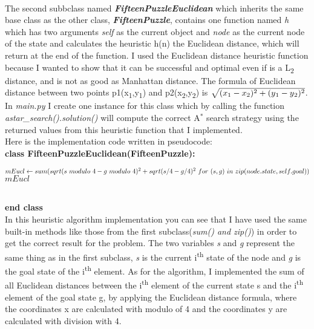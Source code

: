 \documentclass[14pt]{article}
\begin{document}
\vspace{2.5 mm}
\\The second subbclass named \textbf{\textit{FifteenPuzzleEuclidean}} which inherits the same base class as the other class, \textbf{\textit{FifteenPuzzle}}, contains one function named \textit{h} which has two arguments \textit{self} as the current object and \textit{node} as the current node of the state and calculates the heuristic h(n) \eq the Euclidean distance, which will return at the end of the function. I used the Euclidean distance heuristic function because I wanted to show that it can be successful and optimal even if is a L\textsubscript{2} distance, and is not as good as Manhattan distance. The formula of Euclidean distance between two points p1(x\textsubscript{1},y\textsubscript{1}) and p2(x\textsubscript{2},y\textsubscript{2}) is $\sqrt{(x\textsubscript{1} - x\textsubscript{2})^2 + (y\textsubscript{1} - y\textsubscript{2})^2}$. In \textit{main.py} I create one instance for this class which by calling the function \textit{astar\_search().solution()} will compute the correct A$^{*}$ search strategy using the returned values from this heuristic function that I implemented.
\vspace{10 mm}
\\Here is the implementation code written in pseudocode:
\vspace{2.5 mm}
\\\textbf{class FifteenPuzzleEuclidean(FifteenPuzzle):}
\begin{algorithmic}
    \State $mEucl \gets sum(sqrt(s \ modulo \ 4 - g \ modulo \ 4)^2 + sqrt(s/4 - g/4)^2 \ for \ (s, g)\newline \ in \ zip(node.state, self.goal))$
    \State \Return $mEucl$
\EndFunction
\end{algorithmic}
\\\textbf{end class}
\vspace{2.5 mm}
\\In this heuristic algorithm implementation you can see that I have used the same built-in methods like those from the first subclass(\textit{sum() and zip()}) in order to get the correct result for the problem. The two variables \textit{s} and \textit{g} represent the same thing as in the first subclass, \textit{s} is the current i\textsuperscript{th} state of the node and \textit{g} is the goal state of the i\textsuperscript{th} element. As for the algorithm, I implemented the sum of all  Euclidean distances between the i\textsuperscript{th} element of the current state s and the i\textsuperscript{th} element of the goal state g, by applying the Euclidean distance formula, where the coordinates x are calculated with modulo of 4 and the coordinates y are calculated with division with 4.
\end{document}
